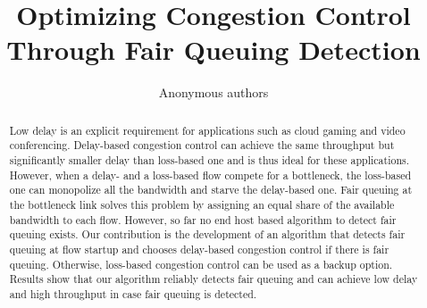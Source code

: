 \documentclass[runningheads]{llncs}
\begin{document}
%
\title{Optimizing Congestion Control Through Fair Queuing Detection}


%
\author{Anonymous authors}
%
%
%
\maketitle              %
%


\begin{abstract}
Low delay is an explicit requirement for applications such as cloud gaming and video conferencing. Delay-based congestion control can achieve the same throughput but significantly smaller delay than loss-based one and is thus ideal for these applications. However, when a delay- and a loss-based flow compete for a bottleneck, the loss-based one can monopolize all the bandwidth and starve the delay-based one. Fair queuing at the bottleneck link solves this problem by assigning an equal share of the available bandwidth to each flow. However, so far no end host based algorithm to detect fair queuing exists. Our contribution is the development of an algorithm that detects fair queuing at flow startup and chooses delay-based congestion control if there is fair queuing. Otherwise, loss-based congestion control can be used as a backup option. Results show that our algorithm reliably detects fair queuing and can achieve low delay and high throughput in case fair queuing is detected. 

\end{abstract}
%
%
%
\end{document}
